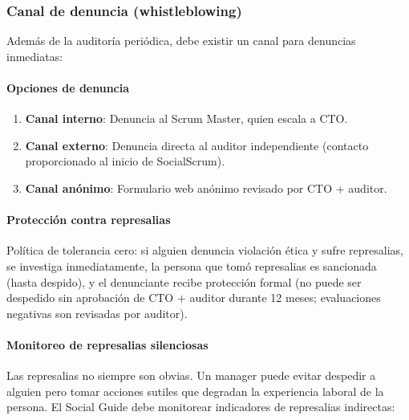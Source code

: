 \subsubsection{Canal de denuncia (whistleblowing)}

Además de la auditoría periódica, debe existir un canal para denuncias inmediatas:

\paragraph{Opciones de denuncia}

\begin{enumerate}
    \item \textbf{Canal interno}: Denuncia al Scrum Master, quien escala a CTO.
    \item \textbf{Canal externo}: Denuncia directa al auditor independiente (contacto proporcionado al inicio de SocialScrum).
    \item \textbf{Canal anónimo}: Formulario web anónimo revisado por CTO + auditor.
\end{enumerate}

\paragraph{Protección contra represalias}

Política de tolerancia cero: si alguien denuncia violación ética y sufre represalias, se investiga inmediatamente, la persona que tomó represalias es sancionada (hasta despido), y el denunciante recibe protección formal (no puede ser despedido sin aprobación de CTO + auditor durante 12 meses; evaluaciones negativas son revisadas por auditor).

\paragraph{Monitoreo de represalias silenciosas}

Las represalias no siempre son obvias. Un manager puede evitar despedir a alguien pero tomar acciones sutiles que degradan la experiencia laboral de la persona. El Social Guide debe monitorear indicadores de represalias indirectas:

